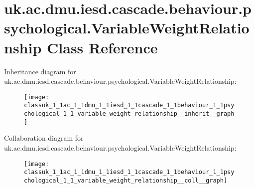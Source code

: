 \hypertarget{classuk_1_1ac_1_1dmu_1_1iesd_1_1cascade_1_1behaviour_1_1psychological_1_1_variable_weight_relationship}{\section{uk.\-ac.\-dmu.\-iesd.\-cascade.\-behaviour.\-psychological.\-Variable\-Weight\-Relationship Class Reference}
\label{classuk_1_1ac_1_1dmu_1_1iesd_1_1cascade_1_1behaviour_1_1psychological_1_1_variable_weight_relationship}
}


Inheritance diagram for uk.\-ac.\-dmu.\-iesd.\-cascade.\-behaviour.\-psychological.\-Variable\-Weight\-Relationship\-:\nopagebreak
\begin{figure}[H]
\begin{center}
\leavevmode
\texttt{[image: classuk\_1\_1ac\_1\_1dmu\_1\_1iesd\_1\_1cascade\_1\_1behaviour\_1\_1psychological\_1\_1\_variable\_weight\_relationship\_\_inherit\_\_graph]}
\end{center}
\end{figure}


Collaboration diagram for uk.\-ac.\-dmu.\-iesd.\-cascade.\-behaviour.\-psychological.\-Variable\-Weight\-Relationship\-:\nopagebreak
\begin{figure}[H]
\begin{center}
\leavevmode
\texttt{[image: classuk\_1\_1ac\_1\_1dmu\_1\_1iesd\_1\_1cascade\_1\_1behaviour\_1\_1psychological\_1\_1\_variable\_weight\_relationship\_\_coll\_\_graph]}
\end{center}
\end{figure}
